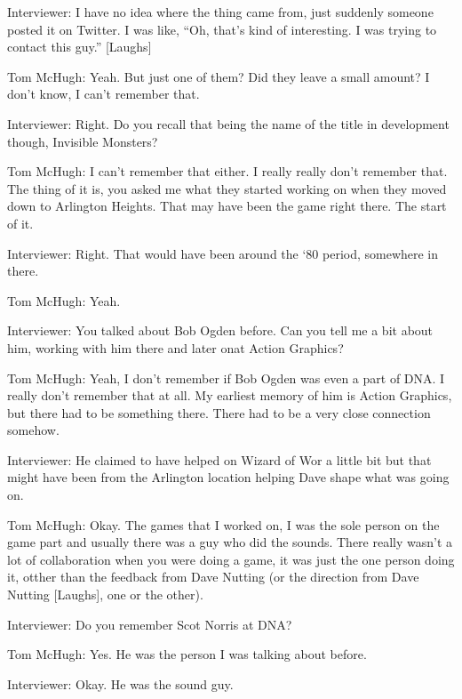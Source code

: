 \textcolor{interviewer}{Interviewer:} I have no idea where the thing came from, just suddenly someone posted it on Twitter. I was like, “Oh, that’s kind of interesting. I was trying to contact this guy.” [Laughs]

\textcolor{interviewee}{Tom McHugh:} Yeah. But just one of them? Did they leave a small amount? I don’t know, I can’t remember that.

\textcolor{interviewer}{Interviewer:} Right. Do you recall that being the name of the title in development though, Invisible Monsters?

\textcolor{interviewee}{Tom McHugh:} I can’t remember that either. I really really don’t remember that. The thing of it is, you asked me what they started working on when they moved down to Arlington Heights. That may have been the game right there. The start of it.

\textcolor{interviewer}{Interviewer:} Right. That would have been around the ‘80 period, somewhere in there.

\textcolor{interviewee}{Tom McHugh:} Yeah.

\textcolor{interviewer}{Interviewer:} You talked about Bob Ogden before. Can you tell me a bit about him, working with him there and later onat Action Graphics?

\textcolor{interviewee}{Tom McHugh:} Yeah, I don’t remember if Bob Ogden was even a part of DNA. I really don’t remember that at all. My earliest memory of him is Action Graphics, but there had to be something there. There had to be a very close connection somehow.

\textcolor{interviewer}{Interviewer:} He claimed to have helped on Wizard of Wor a little bit but that might have been from the Arlington location helping Dave shape what was going on.

\textcolor{interviewee}{Tom McHugh:} Okay. The games that I worked on, I was the sole person on the game part and usually there was a guy who did the sounds. There really wasn’t a lot of collaboration when you were doing a game, it was just the one person doing it, otther than the feedback from Dave Nutting (or the direction from Dave Nutting [Laughs], one or the other).


\textcolor{interviewer}{Interviewer:} Do you remember Scot Norris at DNA?

\textcolor{interviewee}{Tom McHugh:} Yes. He was the person I was talking about before.

\textcolor{interviewer}{Interviewer:} Okay. He was the sound guy.

